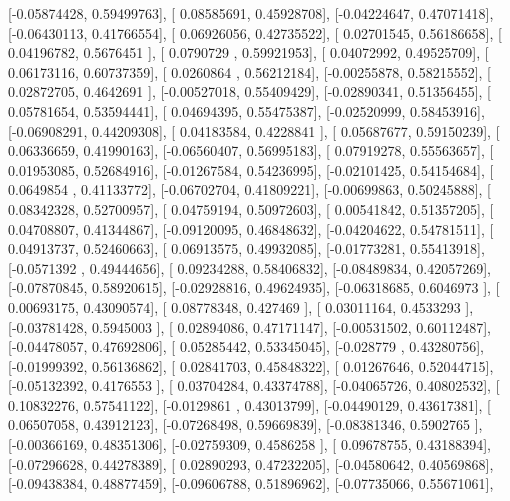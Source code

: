\documentclass{article}
\begin{document}
       [-0.05874428,  0.59499763],
       [ 0.08585691,  0.45928708],
       [-0.04224647,  0.47071418],
       [-0.06430113,  0.41766554],
       [ 0.06926056,  0.42735522],
       [ 0.02701545,  0.56186658],
       [ 0.04196782,  0.5676451 ],
       [ 0.0790729 ,  0.59921953],
       [ 0.04072992,  0.49525709],
       [ 0.06173116,  0.60737359],
       [ 0.0260864 ,  0.56212184],
       [-0.00255878,  0.58215552],
       [ 0.02872705,  0.4642691 ],
       [-0.00527018,  0.55409429],
       [-0.02890341,  0.51356455],
       [ 0.05781654,  0.53594441],
       [ 0.04694395,  0.55475387],
       [-0.02520999,  0.58453916],
       [-0.06908291,  0.44209308],
       [ 0.04183584,  0.4228841 ],
       [ 0.05687677,  0.59150239],
       [ 0.06336659,  0.41990163],
       [-0.06560407,  0.56995183],
       [ 0.07919278,  0.55563657],
       [ 0.01953085,  0.52684916],
       [-0.01267584,  0.54236995],
       [-0.02101425,  0.54154684],
       [ 0.0649854 ,  0.41133772],
       [-0.06702704,  0.41809221],
       [-0.00699863,  0.50245888],
       [ 0.08342328,  0.52700957],
       [ 0.04759194,  0.50972603],
       [ 0.00541842,  0.51357205],
       [ 0.04708807,  0.41344867],
       [-0.09120095,  0.46848632],
       [-0.04204622,  0.54781511],
       [ 0.04913737,  0.52460663],
       [ 0.06913575,  0.49932085],
       [-0.01773281,  0.55413918],
       [-0.0571392 ,  0.49444656],
       [ 0.09234288,  0.58406832],
       [-0.08489834,  0.42057269],
       [-0.07870845,  0.58920615],
       [-0.02928816,  0.49624935],
       [-0.06318685,  0.6046973 ],
       [ 0.00693175,  0.43090574],
       [ 0.08778348,  0.427469  ],
       [ 0.03011164,  0.4533293 ],
       [-0.03781428,  0.5945003 ],
       [ 0.02894086,  0.47171147],
       [-0.00531502,  0.60112487],
       [-0.04478057,  0.47692806],
       [ 0.05285442,  0.53345045],
       [-0.028779  ,  0.43280756],
       [-0.01999392,  0.56136862],
       [ 0.02841703,  0.45848322],
       [ 0.01267646,  0.52044715],
       [-0.05132392,  0.4176553 ],
       [ 0.03704284,  0.43374788],
       [-0.04065726,  0.40802532],
       [ 0.10832276,  0.57541122],
       [-0.0129861 ,  0.43013799],
       [-0.04490129,  0.43617381],
       [ 0.06507058,  0.43912123],
       [-0.07268498,  0.59669839],
       [-0.08381346,  0.5902765 ],
       [-0.00366169,  0.48351306],
       [-0.02759309,  0.4586258 ],
       [ 0.09678755,  0.43188394],
       [-0.07296628,  0.44278389],
       [ 0.02890293,  0.47232205],
       [-0.04580642,  0.40569868],
       [-0.09438384,  0.48877459],
       [-0.09606788,  0.51896962],
       [-0.07735066,  0.55671061],
\end{document}
